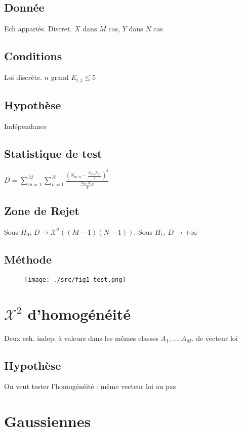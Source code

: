 \documentclass[9pt]{article}
\theoremstyle{plain}%
\theoremstyle{definition}
\theoremstyle{remark}
\begin{document}
\begin{multicols}{3}
\subsection*{Donnée}
Ech appariés. Discret. $ X $ dans $ M $ cas, $ Y $ dans $ N $ cas   

\subsection*{Conditions}
Loi discrète. $ n $ grand $ E_{i,j} \leq 5$ 

\subsection*{Hypothèse}
Indépendance

\subsection*{Statistique de test}
$D = \sum_{m=1}^{M}\sum_{n=1}^{N}\frac{( N_{m,n} - \frac{N_{m, \centerdot} N_{\centerdot, n}}{T})^2}{\frac{N_{m, \centerdot} N_{\centerdot, n}}{T}}$

\subsection*{Zone de Rejet}
Sous $ H_0 $, $ D \to \mathcal{X}^2 ((M-1)(N-1)) $. Sous $ H_1 $, $ D \to +\infty  $

\subsection*{Méthode}
\begin{figure}[!h]
    \centering
    \texttt{[image: ./src/fig1\_test.png]}
\end{figure}


\section{$ \mathcal{X}^2 $ d'homogénéité}
Deux ech. indep. à valeurs dans les mêmes classes $ A_1, \dots, A_M $. de vecteur loi  

\subsection*{Hypothèse}
On veut tester l'homogénéité : même vecteur loi ou pas

\section{Gaussiennes}

\end{multicols}
\end{document}
